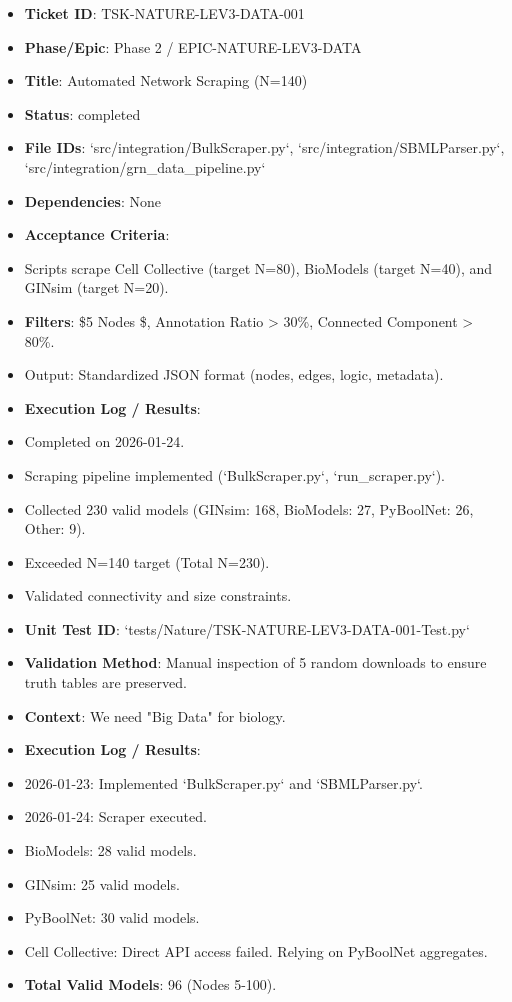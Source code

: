 \documentclass{article}
\begin{document}
\begin{itemize}
\item   \textbf{Ticket ID}: TSK-NATURE-LEV3-DATA-001
\item   \textbf{Phase/Epic}: Phase 2 / EPIC-NATURE-LEV3-DATA
\item   \textbf{Title}: Automated Network Scraping (N=140)
\item   \textbf{Status}: completed
\item   \textbf{File IDs}: `src/integration/BulkScraper.py`, `src/integration/SBMLParser.py`, `src/integration/grn\_data\_pipeline.py`
\item   \textbf{Dependencies}: None
\item   \textbf{Acceptance Criteria}:
\item   Scripts scrape Cell Collective (target N=80), BioModels (target N=40), and GINsim (target N=20).
\item   \textbf{Filters}: \$5 \le Nodes \$, Annotation Ratio > 30\%, Connected Component > 80\%.
\item   Output: Standardized JSON format (nodes, edges, logic, metadata).
\item   \textbf{Execution Log / Results}:
\item   Completed on 2026-01-24.
\item   Scraping pipeline implemented (`BulkScraper.py`, `run\_scraper.py`).
\item   Collected 230 valid models (GINsim: 168, BioModels: 27, PyBoolNet: 26, Other: 9).
\item   Exceeded N=140 target (Total N=230).
\item   Validated connectivity and size constraints.
\item   \textbf{Unit Test ID}: `tests/Nature/TSK-NATURE-LEV3-DATA-001-Test.py`
\item   \textbf{Validation Method}: Manual inspection of 5 random downloads to ensure truth tables are preserved.
\item   \textbf{Context}: We need "Big Data" for biology.
\item   \textbf{Execution Log / Results}:
\item   2026-01-23: Implemented `BulkScraper.py` and `SBMLParser.py`.
\item   2026-01-24: Scraper executed.
\item   BioModels: 28 valid models.
\item   GINsim: 25 valid models.
\item   PyBoolNet: 30 valid models.
\item   Cell Collective: Direct API access failed. Relying on PyBoolNet aggregates.
\item   \textbf{Total Valid Models}: 96 (Nodes 5-100).
\end{itemize}
\end{document}
